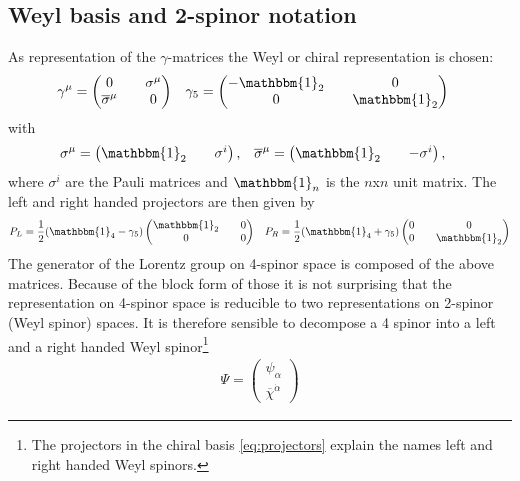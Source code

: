 \subsection{Weyl basis and 2-spinor notation}\label{sec:2spinor_notation}
As representation of the $\gamma$-matrices the Weyl or chiral representation is chosen:
\begin{align}
&\gamma^\mu = \begin{pmatrix}
0 && \sigma^\mu\\
\overline{\sigma}^\mu && 0
\end{pmatrix} &&
\gamma_5 = \begin{pmatrix}
-\mathbbm{1}_2 && 0\\
0 && \mathbbm{1}_2
\end{pmatrix}
\end{align}
with
\begin{align}
&\sigma^\mu = \begin{pmatrix}
\mathbbm{1}_2 && \sigma^i
\end{pmatrix}, &&
\overline{\sigma}^\mu = \begin{pmatrix}
\mathbbm{1}_2 && -\sigma^i
\end{pmatrix},\label{eq:Pauli}
\end{align}
where $\sigma^i$ are the Pauli matrices and $\mathbbm{1}_n$ is the $n$x$n$ unit matrix. The left and right handed projectors are then given by
\begin{align}
P_L = \frac{1}{2}(\mathbbm{1}_4 - \gamma_5)\begin{pmatrix}
\mathbbm{1}_2 && 0\\
0 && 0
\end{pmatrix} && 
P_R = \frac{1}{2}(\mathbbm{1}_4 + \gamma_5)\begin{pmatrix}
0 && 0\\
0 && \mathbbm{1}_2
\end{pmatrix}\label{eq:projectors}
\end{align}
The generator of the Lorentz group on 4-spinor space is composed of the above matrices. Because of the block form of those it is not surprising that the representation on 4-spinor space is reducible to two representations on 2-spinor (Weyl spinor) spaces. It is therefore sensible to decompose a 4 spinor into a left and a right handed Weyl spinor\footnote{The projectors in the chiral basis \ref{eq:projectors} explain the names left and right handed Weyl spinors.}
\begin{align}
\Psi = \begin{pmatrix}
\psi_\alpha \\
\overline{\chi}^{\dot{\alpha}}
\end{pmatrix}
\end{align}
